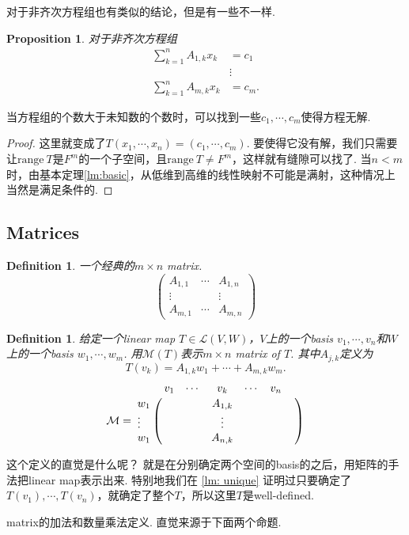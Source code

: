 \documentclass{article}
\newtheorem{proposition}[theorem]{Proposition}
\newtheorem{definition}[theorem]{Definition}
\newcommand\range[1]{\text{range}\ #1}
\begin{document}
{\color{red} 对于非齐次方程组也有类似的结论，但是有一些不一样}.

\begin{proposition}
对于非齐次方程组
$$
\begin{aligned}
\sum\limits_{k=1}^{n}A_{1,k}x_k&=c_1 \\
&\vdots\\
\sum\limits_{k=1}^{n}A_{m,k}x_k&=c_m.
\end{aligned}
$$
\end{proposition}
当方程组的个数大于未知数的个数时，可以找到一些$c_1,\cdots,c_m$使得方程无解.

\begin{proof}
这里就变成了$T(x_1,\cdots,x_n) =  (c_1,\cdots,c_m)$. 要使得它没有解，我们只需要让$\range{T}$是$F^m$的一个子空间，且$\range{T} \neq F^m$，这样就有缝隙可以找了. 当$n < m$时，由基本定理\ref{lm:basic}，从低维到高维的线性映射不可能是满射，这种情况上当然是满足条件的.
\end{proof}

\newpage
\subsection{Matrices}

\begin{definition}
\rm 一个经典的$m \times n$ matrix.
$$
\begin{pmatrix}
A_{1,1} & \cdots & A_{1,n} \\
\vdots & & \vdots \\
A_{m,1} & \cdots & A_{m,n}
\end{pmatrix}
$$
\end{definition}

\begin{definition}
\rm 给定一个linear map $T \in \mathcal{L}(V,W)$，$V$上的一个basis $v_1,\cdots,v_n$和$W$上的一个basis $w_1,\cdots,w_m$. 用$\mathcal{M}(T)$表示$m \times n$ matrix of $T$. 其中$A_{j,k}$定义为
$$
T(v_k) = A_{1,k}w_1 +  \cdots + A_{m,k}w_m.
$$
$$
\mathcal{M} = \bordermatrix{
	& v_1& \cdots& v_k&\cdots& v_n \cr
w_1 &&&A_{1,k}&&& \cr
\vdots &&&\vdots&&& \cr
w_1 &&&A_{n,k}&&& \cr
}
$$ 
\end{definition}

这个定义的直觉是什么呢？ {\color{blue}就是在分别确定两个空间的basis的之后，用矩阵的手法把linear map表示出来}. 特别地我们在 \ref{lm: unique} 证明过只要确定了$T(v_1),\cdots,T(v_n)$，就确定了整个$T$，所以这里$T$是well-defined. 

{\color{red} matrix的加法和数量乘法定义}. 直觉来源于下面两个命题.
\end{document}
